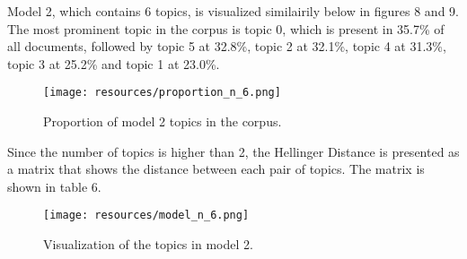 Model 2, which contains 6 topics, is visualized similairily below in figures 8 and 9. The most prominent topic in the corpus is topic 0, which is present in 35.7\% of all documents, followed by topic 5 at 32.8\%, topic 2 at 32.1\%, topic 4 at 31.3\%, topic 3 at 25.2\% and topic 1 at 23.0\%.

\begin{figure}[H]
    \centering
    \texttt{[image: resources/proportion\_n\_6.png]}
    \caption{Proportion of model 2 topics in the corpus.}
    \label{fig:proportion_n_6}
\end{figure}

Since the number of topics is higher than 2, the Hellinger Distance is presented as a matrix that shows the distance between each pair of topics. The matrix is shown in table 6.

\begin{table}[H]
    \centering
    \caption{Hellinger Distance matrix of model 2.}
    \label{tab:hellinger_distance_matrix}
  \end{table}

\begin{figure}[H]
    \centering
    \texttt{[image: resources/model\_n\_6.png]}
    \caption{Visualization of the topics in model 2.}
    \label{fig:topic_model_2}
\end{figure}